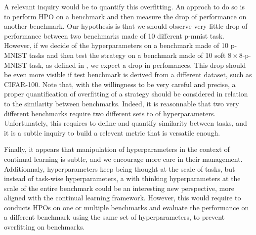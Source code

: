 \documentclass[twocolumn]{article}
\begin{document}
\vspace{1mm}
\noindent
A relevant inquiry would be to quantify this overfitting. An approch to do so is to perform HPO on a benchmark and then measure the drop of performance on another benchmark. Our hypothesis is that we should observe very little drop of performance between two benchmarks made of 10 different p-mnist task. However, if we decide of the hyperparameters on a benchmark made of 10 p-MNIST tasks and then test the strategy on a benchmark made of 10 soft $8\times8$-p-MNIST task, as defined in \cite{EWC}, we expect a drop in perfomances. This drop should be even more visible if test benchmark is derived from a different dataset, such as CIFAR-100. Note that, with the willingness to be very careful and precise, a proper quantification of overfitting of a strategy should be considered in relation to the similarity between benchmarks. Indeed, it is reasonnable that two very different benchmarks require two different sets to of hyperparameters. Unfortunately, this requires to define and quantify similarity between tasks, and it is a subtle inquiry to build a relevent metric that is versatile enough.

\vspace{1mm}
\noindent
Finally, it appears that manipulation of hyperparameters in the context of continual learning is subtle, and we encourage more care in their management. Additionnaly, hyperparameters keep being thought at the scale of tasks, but instead of task-wise hyperparameters, a  with thinking hyperparameters at the scale of the entire benchmark could be an interesting new perspective, more aligned with the continual learning framework. However, this would require to conducts HPOs on one or multiple benchmarks and evaluate the performance on a different benchmark using the same set of hyperparameters, to prevent overfitting on benchmarks.
\end{document}
